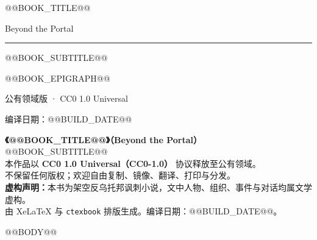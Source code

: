 \documentclass[10.5pt,openany,oneside,fontset=fandol]{ctexbook}
\begin{document}
\frontmatter
\begin{titlepage}
  \centering
  \vspace*{3.2cm}
  {\Huge\heiti @@BOOK_TITLE@@\par}
  \vspace{0.7em}
  {\normalsize\color{Muted} Beyond the Portal\par}
  \vspace{1.1em}
  {\color{RuleGray}\rule{4.5cm}{0.5pt}\par}
  \vspace{1.1em}
  {\normalsize\kaishu\color{Muted} @@BOOK_SUBTITLE@@\par}
  \vfill
  {\small\kaishu\color{Muted} @@BOOK_EPIGRAPH@@\par}
  \vspace{2.4cm}
  {\small\color{Muted} 公有领域版 · CC0 1.0 Universal\par}
  \vspace{0.6em}
  {\footnotesize\color{Muted} 编译日期：@@BUILD_DATE@@\par}
\end{titlepage}

\thispagestyle{empty}
\vspace*{\fill}
\begin{flushleft}
\footnotesize\color{Muted}
\textbf{《@@BOOK_TITLE@@》（Beyond the Portal）}\\
@@BOOK_SUBTITLE@@\\[1em]
本作品以 \textbf{CC0 1.0 Universal（CC0-1.0）} 协议释放至公有领域。\\
不保留任何版权；欢迎自由复制、镜像、翻译、打印与分发。\\[1em]
\textbf{虚构声明：}本书为架空反乌托邦讽刺小说，文中人物、组织、事件与对话均属文学虚构。\\[1em]
由 XeLaTeX 与 \texttt{ctexbook} 排版生成。编译日期：@@BUILD_DATE@@。
\end{flushleft}
\clearpage

\tableofcontents
\clearpage

\mainmatter
@@BODY@@
\end{document}
